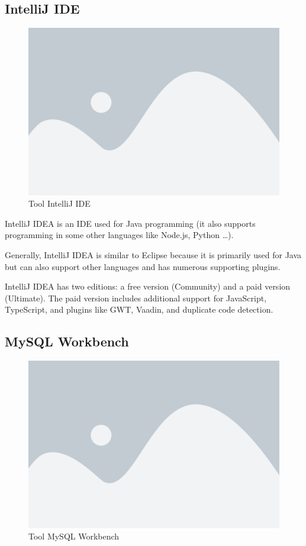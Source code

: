 \documentclass[../Main.tex]{subfiles}
\begin{document}
\subsection{IntelliJ IDE}
\begin{figure}[H]
    \centering
    \includegraphics[width=\textwidth]{Figure/ide.png}
    \caption{Tool IntelliJ IDE}
    \label{fig:ide}
\end{figure}
IntelliJ IDEA is an IDE used for Java programming (it also supports programming in some other languages like Node.js, Python \dots).

Generally, IntelliJ IDEA is similar to Eclipse because it is primarily used for Java but can also support other languages and has numerous supporting plugins.

IntelliJ IDEA has two editions: a free version (Community) and a paid version (Ultimate).
The paid version includes additional support for JavaScript, TypeScript, and plugins like GWT, Vaadin, and duplicate code detection.

\subsection{MySQL Workbench}

\begin{figure}[H]
    \centering
    \includegraphics[width=\textwidth]{Figure/mysql.png}
    \caption{Tool MySQL Workbench}
    \label{fig:mySQL}
\end{figure}
\end{document}
